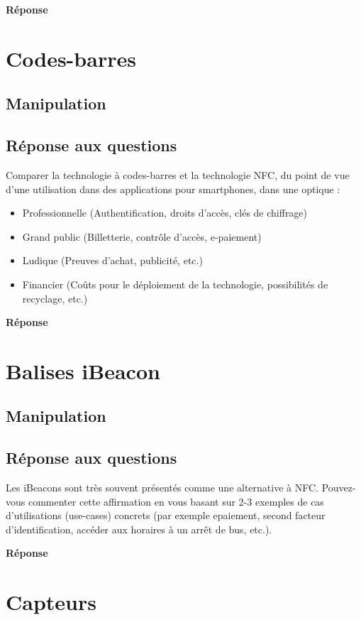\documentclass[francais,12pt]{article}
\begin{document}
	 {\color[rgb]{0,0.5,0.23}\textbf{Réponse}}
	 
	
	\section*{Codes-barres}
	\subsection*{Manipulation}
	\subsection*{Réponse aux questions}
	Comparer la technologie à codes-barres et la technologie NFC, du point de vue d'une utilisation dans des applications pour smartphones, dans une optique : 
	\begin{itemize}
		\item Professionnelle (Authentification, droits d’accès, clés de chiffrage) 
		\item Grand public (Billetterie, contrôle d’accès, e-paiement) 
		\item Ludique (Preuves d'achat, publicité, etc.)
		\item Financier (Coûts pour le déploiement de la technologie, possibilités de recyclage, etc.) 
	\end{itemize}

	{\color[rgb]{0,0.5,0.23}\textbf{Réponse}}
	
	
	\section*{Balises iBeacon}
	\subsection*{Manipulation}
	\subsection*{Réponse aux questions}
	Les iBeacons sont très souvent présentés comme une alternative à NFC. Pouvez-vous commenter cette affirmation en vous basant sur 2-3 exemples de cas d’utilisations (use-cases) concrets (par exemple epaiement, second facteur d’identification, accéder aux horaires à un arrêt de bus, etc.). 

	{\color[rgb]{0,0.5,0.23}\textbf{Réponse}}
	
	\section*{Capteurs}
\end{document}
